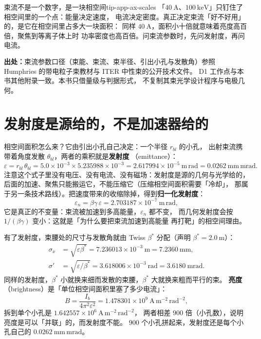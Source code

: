 \begin{tip}{束流不是一个数字，是一块相空间}{tip-app-ax-scales}
「$40\ \mathrm{A}$、$100\ \mathrm{keV}$」只钉住了相空间里的一个点：能量决定速度，
电流决定密度。真正决定束流「好不好用」的，是它在相空间里占多大一块面积：
同样 $40\ \mathrm{A}$，面积小十倍就意味着亮度高百倍，聚焦到等离子体上时
功率密度也高百倍。问束流参数时，先问发射度，再问电流。
\end{tip}

{\footnotesize
\textbf{出处：}束流参数口径（束能、束流、束半径、引出小孔与发散角）参照
Humphries 的带电粒子束教材与 ITER 中性束的公开技术文件。
D1 工作点与本书其他附录一致。本书只借量级与判据形式，
不复制其束光学设计程序与电极几何。
}

\section{发射度是源给的，不是加速器给的}
\label{sec:app-ax-emittance}

相空间面积怎么来？它由引出小孔自己决定：一个半径 $r_{bl}$ 的小孔，
出射束流携带着角度发散 $\theta_{bl}$，两者的乘积就是\textbf{发射度}
（emittance）：
\begin{equation}
\varepsilon=r_{bl}\,\theta_{bl}
=5.0\times10^{-3}\times5.235988\times10^{-3}
=2.617994\times10^{-5}\ \mathrm{m\,rad}=0.0262\ \mathrm{mm\,mrad}.
\label{eq:app-ax-emit}
\end{equation}
注意这个式子里没有电压、没有电流、没有磁场：发射度是源的几何与光学给的，
后面的加速、聚焦只能搬运它，不能压缩它（压缩相空间面积需要「冷却」，
那属于另一条技术路线）。把速度带来的收缩除掉，得到\textbf{归一化发射度}：
\begin{equation}
\varepsilon_n=\beta\gamma\,\varepsilon=2.703187\times10^{-7}\ \mathrm{m\,rad},
\label{eq:app-ax-enorm}
\end{equation}
它是真正的不变量：束流被加速到多高能量，$\varepsilon_n$ 都不变，
而几何发射度会按 $1/(\beta\gamma)$ 变小：这就是「为什么要把束流加速到高能量
再打靶」的相空间理由。

有了发射度，束腰处的尺寸与发散角就由 Twiss $\beta^*$ 分配（声明 $\beta^*=2.0\ \mathrm{m}$）：
\begin{equation}
\begin{aligned}
\sigma_x&=\sqrt{\varepsilon\beta^*}=7.236013\times10^{-3}\ \mathrm{m}=7.2360\ \mathrm{mm},\\
\sigma'&=\sqrt{\varepsilon/\beta^*}=3.618006\times10^{-3}\ \mathrm{rad}=3.6180\ \mathrm{mrad}.
\end{aligned}
\label{eq:app-ax-twiss}
\end{equation}
同样的发射度，$\beta^*$ 小就换来细而发散的束腰，$\beta^*$ 大就换来粗而平行的束。
\textbf{亮度}（brightness）是「单位相空间面积里塞了多少电流」：
\begin{equation}
B=\frac{I_b}{4\pi^2\varepsilon^2}=1.478301\times10^{9}\ \mathrm{A\,m^{-2}\,rad^{-2}},
\label{eq:app-ax-bright}
\end{equation}
拆到单个小孔是 $1.642557\times10^{6}\ \mathrm{A\,m^{-2}\,rad^{-2}}$，
两者相差 $900$ 倍（小孔数），说明亮度是可以「并联」的，而发射度不能。
$900$ 个小孔拼起来，发射度还是每个小孔自己的 $0.0262\ \mathrm{mm\,mrad}$。

